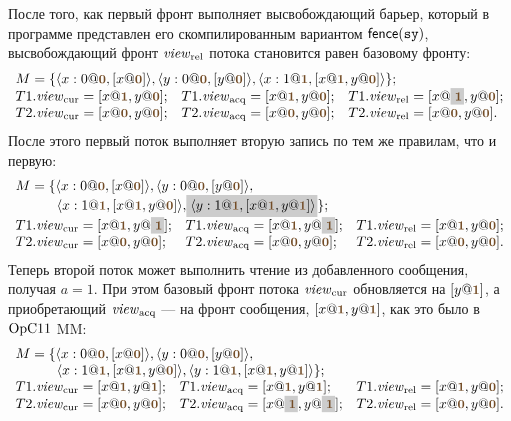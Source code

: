 После того, как первый фронт выполняет высвобождающий барьер, который в программе представлен его скомпилированным
вариантом $\mathsf{fence}({\mathtt{sy}})$, высвобождающий фронт $\mathit{view}_{\mathrm{rel}}$ потока становится равен базовому фронту:
\[
\begin{array}{l l l}
\multicolumn{3}{l}{M = \{\angled{x:0@\tstamp{0}, [x@\tstamp{0}]}, \angled{y:0@\tstamp{0}, [y@\tstamp{0}]},
  \angled{x:1@\tstamp{1}, [x@\tstamp{1}, y@\tstamp{0}]} \};} \\
T1.\Rcur = [x@\tstamp{1}, y@\tstamp{0}];           &
T1.\Racq = [x@\tstamp{1}, y@\tstamp{0}];           &
T1.\Rrel = [x@\graybox{\tstamp{1}}, y@\tstamp{0}]; \\
T2.\Rcur = [x@\tstamp{0}, y@\tstamp{0}]; &
T2.\Racq = [x@\tstamp{0}, y@\tstamp{0}]; &
T2.\Rrel = [x@\tstamp{0}, y@\tstamp{0}]. \\
\end{array}
\]
После этого первый поток выполняет вторую запись по тем же правилам, что и первую:
\[
\begin{array}{l l l}
\multicolumn{3}{l}{M = \{\angled{x:0@\tstamp{0}, [x@\tstamp{0}]}, \angled{y:0@\tstamp{0}, [y@\tstamp{0}]},} \\
\multicolumn{3}{l}{
\quad \quad \quad \angled{x:1@\tstamp{1}, [x@\tstamp{1}, y@\tstamp{0}]}, \graybox{\angled{y:1@\tstamp{1}, [x@\tstamp{1}, y@\tstamp{1}]}} \};} \\
T1.\Rcur = [x@\tstamp{1}, y@\graybox{\tstamp{1}}]; &
T1.\Racq = [x@\tstamp{1}, y@\graybox{\tstamp{1}}]; &
T1.\Rrel = [x@\tstamp{1}, y@\tstamp{0}]; \\
T2.\Rcur = [x@\tstamp{0}, y@\tstamp{0}]; &
T2.\Racq = [x@\tstamp{0}, y@\tstamp{0}]; &
T2.\Rrel = [x@\tstamp{0}, y@\tstamp{0}]. \\
\end{array}
\]
Теперь второй поток может выполнить чтение из добавленного сообщения, получая $a = 1$.
При этом базовый фронт потока $\mathit{view}_{\mathrm{cur}}$ обновляется на $[y@\tstamp{1}]$, а приобретающий $\mathit{view}_{\mathrm{acq}}$ --- на фронт сообщения,
$[x@\tstamp{1}, y@\tstamp{1}]$, как это было в $\mathrm{OpC11}$ MM:
\[
\begin{array}{l l l}
\multicolumn{3}{l}{M = \{\angled{x:0@\tstamp{0}, [x@\tstamp{0}]}, \angled{y:0@\tstamp{0}, [y@\tstamp{0}]},} \\
\multicolumn{3}{l}{
\quad \quad \quad \angled{x:1@\tstamp{1}, [x@\tstamp{1}, y@\tstamp{0}]}, \angled{y:1@\tstamp{1}, [x@\tstamp{1}, y@\tstamp{1}]} \};} \\
T1.\Rcur = [x@\tstamp{1}, y@\tstamp{1}]; &
T1.\Racq = [x@\tstamp{1}, y@\tstamp{1}]; &
T1.\Rrel = [x@\tstamp{1}, y@\tstamp{0}]; \\
T2.\Rcur = [x@\tstamp{0}, y@\tstamp{0}]; &
T2.\Racq = [x@\graybox{\tstamp{1}}, y@\graybox{\tstamp{1}}]; &
T2.\Rrel = [x@\tstamp{0}, y@\tstamp{0}]. \\
\end{array}
\]
